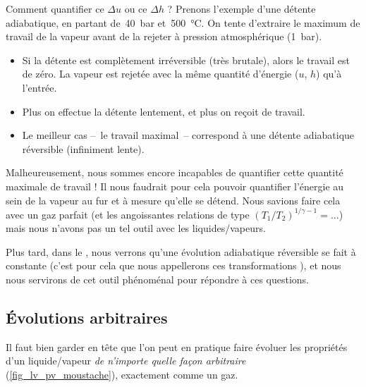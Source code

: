 		Comment quantifier ce $\Delta u$ ou ce $\Delta h$ ? Prenons l’exemple d’une détente adiabatique, en partant de~\SI{40}{\bar} et~\SI{500}{\degreeCelsius}. On tente d’extraire le maximum de travail de la vapeur avant de la rejeter à pression atmosphérique (\SI{1}{\bar}).
		
		\begin{itemize}
			\item Si la détente est complètement irréversible (très brutale), alors le travail est de zéro. La vapeur est rejetée avec la même quantité d’énergie ($u$, $h$) qu’à l’entrée.
			\item Plus on effectue la détente lentement, et plus on reçoit de travail.
			\item Le meilleur cas --\ le travail maximal\ -- correspond à une détente adiabatique réversible (infiniment lente).
		\end{itemize}

		Malheureusement, nous sommes encore incapables de quantifier cette quantité maximale de travail ! Il nous faudrait pour cela pouvoir quantifier l’énergie au sein de la vapeur au fur et à mesure qu’elle se détend. Nous savions faire cela avec un gaz parfait (et les angoissantes relations de type $(T_1/T_2)^{1/\gamma-1} = \ldots$) mais nous n’avons pas un tel outil avec les liquides/vapeurs.


		Plus tard, dans le \courshuit, nous verrons qu’une évolution adiabatique réversible se fait à  constante (c’est pour cela que nous appellerons ces transformations ), et nous nous servirons de cet outil phénoménal pour répondre à ces questions.



	\subsection{Évolutions arbitraires}
	
		Il faut bien garder en tête que l’on peut en pratique faire évoluer les propriétés d’un liquide/vapeur \emph{de n’importe quelle façon arbitraire} (\cref{fig_lv_pv_moustache}), exactement comme un gaz.
		
